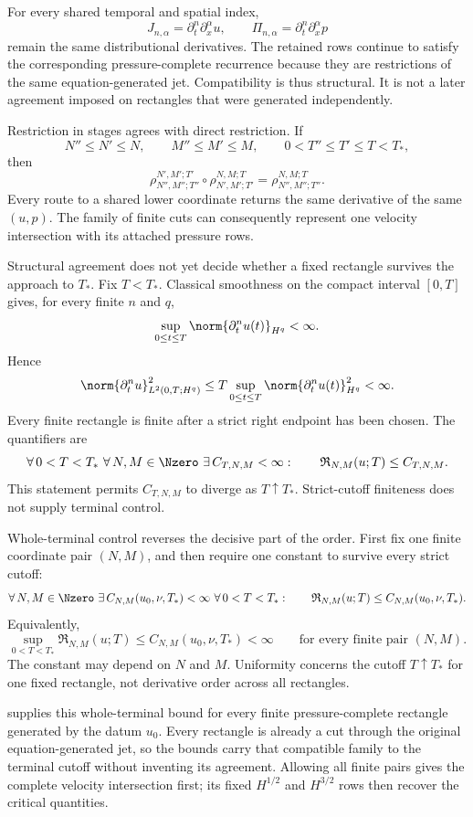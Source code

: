 For every shared temporal and spatial index,
\[
  J_{n,\alpha}
  =
  \partial_t^n\partial_x^\alpha u,
  \qquad
  \Pi_{n,\alpha}
  =
  \partial_t^n\partial_x^\alpha p
\]
remain the same distributional derivatives.
The retained rows continue to satisfy the corresponding pressure-complete recurrence because they are restrictions of the same equation-generated jet.
Compatibility is thus structural.
It is not a later agreement imposed on rectangles that were generated independently.

Restriction in stages agrees with direct restriction.
If
\[
  N''\le N'\le N,
  \qquad
  M''\le M'\le M,
  \qquad
  0<T''\le T'\le T<T_*,
\]
then
\[
  \rho_{N'',M'';T''}^{N',M';T'}
  \circ
  \rho_{N',M';T'}^{N,M;T}
  =
  \rho_{N'',M'';T''}^{N,M;T}.
\]
Every route to a shared lower coordinate returns the same derivative of the same \((u,p)\).
The family of finite cuts can consequently represent one velocity intersection with its attached pressure rows.

Structural agreement does not yet decide whether a fixed rectangle survives the approach to \(T_*\).
Fix \(T<T_*\).
Classical smoothness on the compact interval \([0,T]\) gives, for every finite \(n\) and \(q\),
\[
  \sup_{0\le t\le T}
  \norm{\partial_t^nu(t)}_{H^q}
  <
  \infty.
\]
Hence
\[
  \norm{\partial_t^nu}_{L^2(0,T;H^q)}^2
  \le
  T
  \sup_{0\le t\le T}
  \norm{\partial_t^nu(t)}_{H^q}^2
  <
  \infty.
\]
Every finite rectangle is finite after a strict right endpoint has been chosen.
The quantifiers are
\[
  \forall\,0<T<T_*
  \ \forall\,N,M\in\Nzero
  \ \exists\,C_{T,N,M}<\infty:
  \qquad
  \mathfrak R_{N,M}(u;T)
  \le
  C_{T,N,M}.
\]
This statement permits \(C_{T,N,M}\) to diverge as \(T\uparrow T_*\).
Strict-cutoff finiteness does not supply terminal control.

Whole-terminal control reverses the decisive part of the order.
First fix one finite coordinate pair \((N,M)\), and then require one constant to survive every strict cutoff:
\[
  \forall\,N,M\in\Nzero
  \ \exists\,C_{N,M}(u_0,\nu,T_*)<\infty
  \ \forall\,0<T<T_*:
  \qquad
  \mathfrak R_{N,M}(u;T)
  \le
  C_{N,M}(u_0,\nu,T_*).
\]
Equivalently,
\[
  \sup_{0<T<T_*}
  \mathfrak R_{N,M}(u;T)
  \le
  C_{N,M}(u_0,\nu,T_*)
  <
  \infty
  \qquad
  \text{for every finite pair }(N,M).
\]
The constant may depend on \(N\) and \(M\).
Uniformity concerns the cutoff \(T\uparrow T_*\) for one fixed rectangle, not derivative order across all rectangles.

 supplies this whole-terminal bound for every finite pressure-complete rectangle generated by the datum \(u_0\).
Every rectangle is already a cut through the original equation-generated jet, so the bounds carry that compatible family to the terminal cutoff without inventing its agreement.
Allowing all finite pairs gives the complete velocity intersection first; its fixed \(H^{1/2}\) and \(H^{3/2}\) rows then recover the critical quantities.
